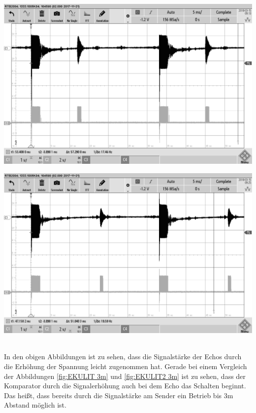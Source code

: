 \begin{minipage}{0.5\textwidth}
\includegraphics[width=1\textwidth%
]{Abbildungen/MessungenP2/15V/2m.png}
\label{fig:EKULIT2 2m}
\end{minipage}
\begin{minipage}{0.5\textwidth}
\includegraphics[width=1\textwidth%
]{Abbildungen/MessungenP2/15V/3m.png}
\label{fig:EKULIT2 3m}
\end{minipage}\\
In den obigen Abbildungen ist zu sehen, dass die Signalstärke der Echos durch die Erhöhung der Spannung leicht zugenommen hat. Gerade bei einem Vergleich der Abbildungen \ref{fig:EKULIT 3m} und \ref{fig:EKULIT2 3m} ist zu sehen, dass der Komparator durch die Signalerhöhung auch bei dem Echo das Schalten beginnt. Das heißt, dass bereits durch die Signalstärke am Sender ein Betrieb bis 3m Abstand möglich ist.




























